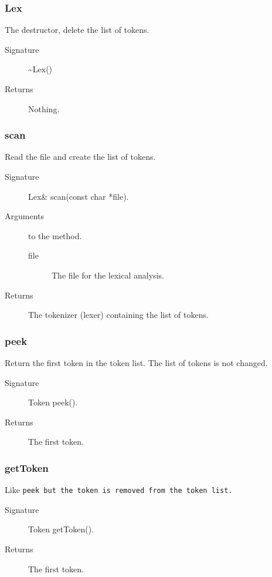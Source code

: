 \subsubsection{Lex}

The destructor, delete the list of tokens.
\begin{description}
  \item [Signature] \~{ }Lex()
  \item [Returns]  Nothing.
\end{description}

\subsubsection{scan}
Read the file and create the list of tokens. 
\begin{description}
   \item [Signature] Lex\& scan(const char *file).
   \item [Arguments] to the method.
     \begin{description}
        \item [file] The file for the lexical analysis.
     \end{description} 
  \item [Returns] The tokenizer (lexer) containing the list of tokens.
\end{description}

\subsubsection{peek}
Return the first token in the token list. The list of tokens  is not
changed.
\begin{description}
  \item [Signature] Token peek().
  \item [Returns] The first token.
\end{description}

\subsubsection{getToken}
Like \tt peek \rm but the token is removed from the token list. 
\begin{description}
  \item [Signature] Token getToken().
  \item [Returns] The first token.
\end{description}

